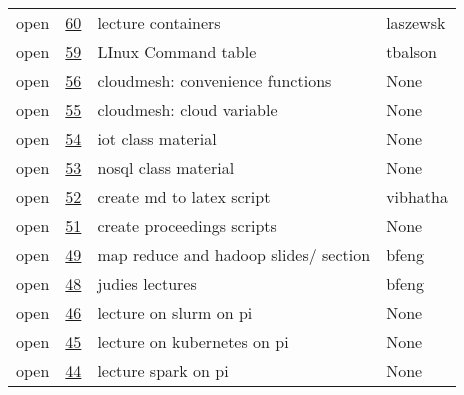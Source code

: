 \begin{center}
\begin{tabular}{llll}
open & \href{https://github.com/cloudmesh/book/issues/60}{60} & lecture containers & laszewsk\\
open & \href{https://github.com/cloudmesh/book/issues/59}{59} & LInux Command table & tbalson\\
open & \href{https://github.com/cloudmesh/book/issues/56}{56} & cloudmesh: convenience functions & None\\
open & \href{https://github.com/cloudmesh/book/issues/55}{55} & cloudmesh: cloud variable & None\\
open & \href{https://github.com/cloudmesh/book/issues/54}{54} & iot class material & None\\
open & \href{https://github.com/cloudmesh/book/issues/53}{53} & nosql class material & None\\
open & \href{https://github.com/cloudmesh/book/issues/52}{52} & create md to latex script & vibhatha\\
open & \href{https://github.com/cloudmesh/book/issues/51}{51} & create proceedings scripts & None\\
open & \href{https://github.com/cloudmesh/book/issues/49}{49} & map reduce and hadoop slides/ section & bfeng\\
open & \href{https://github.com/cloudmesh/book/issues/48}{48} & judies lectures & bfeng\\
open & \href{https://github.com/cloudmesh/book/issues/46}{46} & lecture on slurm on pi & None\\
open & \href{https://github.com/cloudmesh/book/issues/45}{45} & lecture on kubernetes on pi & None\\
open & \href{https://github.com/cloudmesh/book/issues/44}{44} & lecture spark on pi & None\\
\end{tabular}
\end{center}
